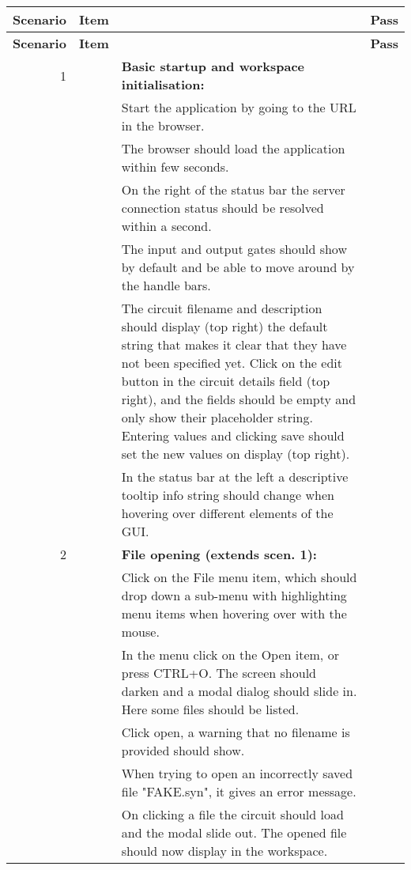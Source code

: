 \documentclass{article}
\newcounter{step}
\newcommand{\step}{\arabic{step}\stepcounter{step}}
\begin{document}
\begin{center}
\begin{longtable}{r r  p{} l } \toprule
\textbf{Scenario} & \textbf{Item} & & \textbf{Pass} \\\midrule
\endfirsthead
\toprule
\textbf{Scenario} & \textbf{Item} & & \textbf{Pass} \\\midrule
\endhead

1 && \textbf{Basic startup and workspace initialisation:}\\
&\step& Start the application by going to the URL in the browser.\\
&\step& The browser should load the application within few seconds.\\
&\step& On the right of the status bar the server connection status should be resolved within a second. \\
&\step& The input and output gates should show by default and be able to move around by the handle bars. \\
&\step& The circuit filename and description should display (top right) the default string that makes it clear that they have not been specified yet. Click on the edit button in the circuit details field (top right), and the fields should be empty and only show their placeholder string. Entering values and clicking save should set the new values on display (top right).\\
&\step& In the status bar at the left a descriptive tooltip info string should change when hovering over different elements of the GUI. & \\ \midrule

2 &\setcounter{step}{1}& \textbf{File opening (extends scen. 1):}\\
&\step& Click on the File menu item, which should drop down a sub-menu with highlighting menu items when hovering over with the mouse. \\
&\step& In the menu click on the Open item, or press CTRL+O. The screen should darken and a modal dialog should slide in. Here some files should be listed.\\
&\step& Click open, a warning that no filename is provided should show.\\
&\step& When trying to open an incorrectly saved file "FAKE.syn", it gives an error message.\\
&\step&On clicking a file the circuit should load and the modal slide out. The opened file should now display in the workspace.\\\midrule


\end{longtable}
\end{center}
\end{document}

